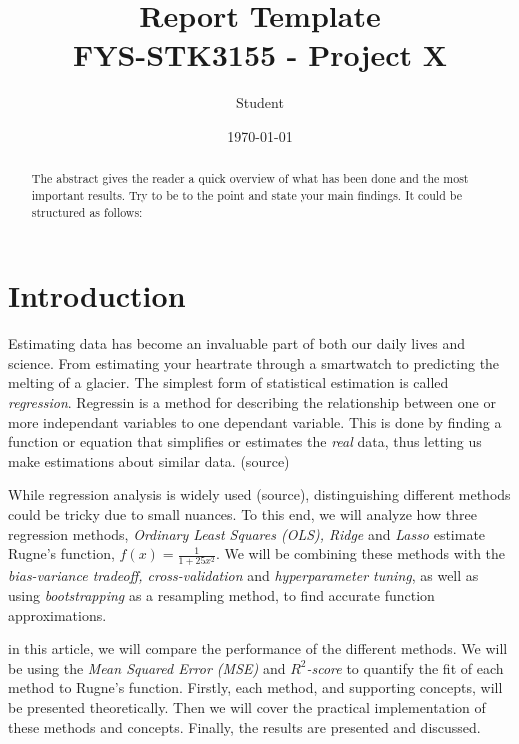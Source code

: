 \documentclass[amssymb,twocolumn,aps]{revtex4}
\begin{document}
\title{Report Template \\
    \normalsize FYS-STK3155 - Project X}
\date{\today}
\author{Student}

\newpage

\begin{abstract}
    The abstract gives the reader a quick overview of what has been done and the most important results. Try to be to the point and state your main findings. It could be structured as follows:

\end{abstract}

\maketitle

\section{Introduction}
Estimating data has become an invaluable part of both our daily lives and science.
From estimating your heartrate through a smartwatch to predicting the melting of a glacier.
The simplest form of statistical estimation is called \textit{regression}.
Regressin is a method for describing the relationship between one or more independant variables to one dependant variable.
This is done by finding a function or equation that simplifies or estimates the \textit{real} data, thus letting us make estimations about similar data. (source)

While regression analysis is widely used (source), distinguishing different methods could be tricky due to small nuances.
To this end, we will analyze how three regression methods, \textit{Ordinary Least Squares (OLS), Ridge} and \textit{Lasso} estimate Rugne's function, $f(x) = \frac{1}{1 + 25x^2}$.
We will be combining these methods with the \textit{bias-variance tradeoff, cross-validation} and \textit{hyperparameter tuning}, as well as using \textit{bootstrapping} as a resampling method, to find accurate function approximations.

in this article, we will compare the performance of the different methods. We will be using the \textit{Mean Squared Error (MSE)} and \textit{$R^2$-score} to quantify the fit of each method to Rugne's function. 
Firstly, each method, and supporting concepts, will be presented theoretically. Then we will cover the practical implementation of these methods and concepts. Finally, the results are presented and discussed. 
\end{document}
